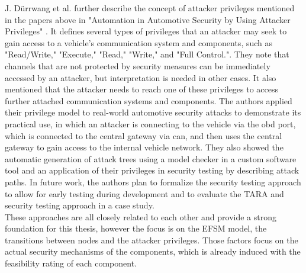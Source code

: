 J. Dürrwang et al. further describe the concept of attacker privileges mentioned in the papers above in "Automation in Automotive Security by Using Attacker Privileges" \cite{attacker_privileges}.
It defines several types of privileges that an attacker may seek to gain access to a vehicle's communication system and components, such as "Read/Write," "Execute," "Read," "Write," and "Full Control.".
They note that channels that are not protected by security measures can be immediately accessed by an attacker, but interpretation is needed in other cases. 
It also mentioned that the attacker needs to reach one of these privileges to access further attached communication systems and components.
The authors applied their privilege model to real-world automotive security attacks to demonstrate its practical use, in which
an attacker is connecting to the vehicle via the \gls{obd} port, which is connected to the central gateway via \gls{can}, and then uses the central gateway to gain access to the internal vehicle network.
They also showed the automatic generation of attack trees using a model checker in a custom software tool and an application of their privileges in security testing by describing attack paths. 
In future work, the authors plan to formalize the security testing approach to allow for early testing during development and to evaluate the TARA and security testing approach in a case study.\\

These approaches are all closely related to each other and provide a strong foundation for this thesis, however the focus is on the EFSM model, the transitions between nodes and the attacker privileges.
Those factors focus on the actual security mechanisms of the components, which is already induced with the feasibility rating of each component.\\

